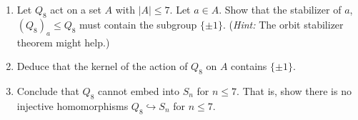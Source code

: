 \documentclass[11pt]{article}
\begin{document}
\begin{enumerate}
  \begin{enumerate}
    \item Let $Q_8$ act on a set $A$ with $|A|\le 7$.  Let $a\in A$.  Show that the stabilizer of $a$,  $(Q_8)_a\le Q_8$ must contain the subgroup $\{\pm1\}$.  (\textit{Hint:} The orbit stabilizer theorem might help.)
    \item Deduce that the kernel of the action of $Q_8$ on $A$ contains $\{\pm1\}$.
    \item Conclude that $Q_8$ cannot embed into $S_n$ for $n\le7$.  That is, show there is no injective homomorphisms $Q_8\hookrightarrow S_n$ for $n\le7$.
  \end{enumerate}
\end{enumerate}
\end{document}
